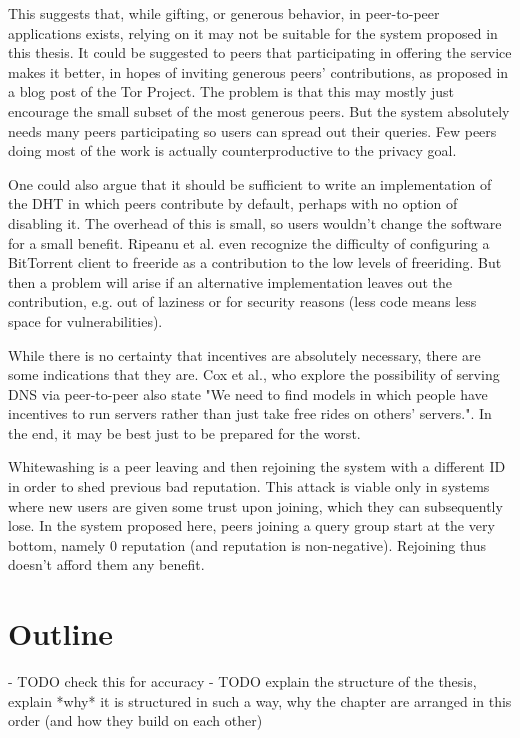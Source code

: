 This suggests that, while gifting, or generous behavior, in peer-to-peer
applications exists, relying on it may not be suitable for the system proposed
in this thesis. It could be suggested to peers that participating in offering
the service makes it better, in hopes of inviting generous peers' contributions,
as proposed in a blog post of the Tor Project\cite{dingledine2009incentive_tor}.
The problem is that this may mostly just encourage the small subset of the most
generous peers. But the system absolutely needs many peers participating so
users can spread out their queries. Few peers doing most of the work is actually
counterproductive to the privacy goal.

One could also argue that it should be sufficient to write an implementation of
the \ac{DHT} in which peers contribute by default, perhaps with no option of
disabling it. The overhead of this is small, so users wouldn't change the
software for a small benefit. Ripeanu et al.\cite{ripeanu2006gifting} even
recognize the difficulty of configuring a BitTorrent client to freeride as a
contribution to the low levels of freeriding. But then a problem will arise if
an alternative implementation leaves out the contribution, e.g. out of laziness
or for security reasons (less code means less space for vulnerabilities).

While there is no certainty that incentives are absolutely necessary, there are
some indications that they are. Cox et al.\cite{cox2002serving}, who explore the
possibility of serving DNS via peer-to-peer also state "We need to find models
in which people have incentives to run servers rather than just take free rides
on others’ servers.". In the end, it may be best just to be prepared for the
worst.

Whitewashing is a peer leaving and then rejoining the system with a different ID
in order to shed previous bad reputation. This attack is viable only in systems
where new users are given some trust upon joining, which they can subsequently
lose. In the system proposed here, peers joining a query group start at the very
bottom, namely 0 reputation (and reputation is non-negative). Rejoining thus
doesn't afford them any benefit.

\section{Outline}
- TODO check this for accuracy
- TODO explain the structure of the thesis, explain *why* it is structured in
  such a way, why the chapter are arranged in this order (and how they build on
  each other)

